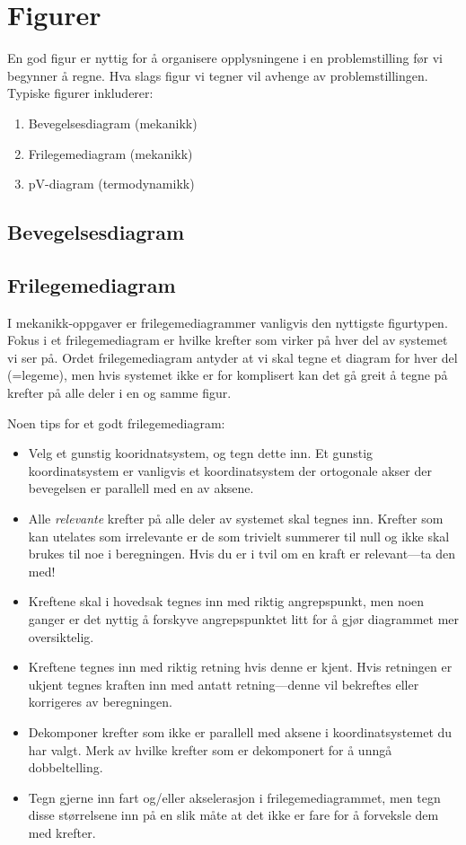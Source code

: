 \chapter{Figurer}
En god figur er nyttig for å organisere opplysningene i en problemstilling før vi begynner å regne. Hva slags figur vi tegner vil avhenge av problemstillingen. Typiske figurer inkluderer:
\begin{enumerate}
\item
	Bevegelsesdiagram (mekanikk)
\item
	Frilegemediagram (mekanikk)
\item
	pV-diagram (termodynamikk)
\end{enumerate}

\section{Bevegelsesdiagram}

\section{Frilegemediagram}
I mekanikk-oppgaver er frilegemediagrammer vanligvis den nyttigste figurtypen. Fokus i et frilegemediagram er hvilke krefter som virker på hver del av systemet vi ser på. Ordet frilegemediagram antyder at vi skal tegne et diagram for hver del (=legeme), men hvis systemet ikke er for komplisert kan det gå greit å tegne på krefter på alle deler i en og samme figur.

Noen tips for et godt frilegemediagram:
\begin{itemize}
\item
Velg et gunstig kooridnatsystem, og tegn dette inn. Et gunstig koordinatsystem er vanligvis et koordinatsystem der ortogonale akser der bevegelsen er parallell med en av aksene.
\item
Alle \emph{relevante} krefter på alle deler av systemet skal tegnes inn. Krefter som kan utelates som irrelevante er de som trivielt summerer til null og ikke skal brukes til noe i beregningen. Hvis du er i tvil om en kraft er relevant---ta den med!
\item
Kreftene skal i hovedsak tegnes inn med riktig angrepspunkt, men noen ganger er det nyttig å forskyve angrepspunktet litt for å gjør diagrammet mer oversiktelig.
\item
Kreftene tegnes inn med riktig retning hvis denne er kjent. Hvis retningen er ukjent tegnes kraften inn med antatt retning---denne vil bekreftes eller korrigeres av beregningen.
\item
Dekomponer krefter som ikke er parallell med aksene i koordinatsystemet du har valgt. Merk av hvilke krefter som er dekomponert for å unngå dobbeltelling.
\item
Tegn gjerne inn fart og/eller akselerasjon i frilegemediagrammet, men tegn disse størrelsene inn på en slik måte at det ikke er fare for å forveksle dem med krefter. 
\end{itemize}

